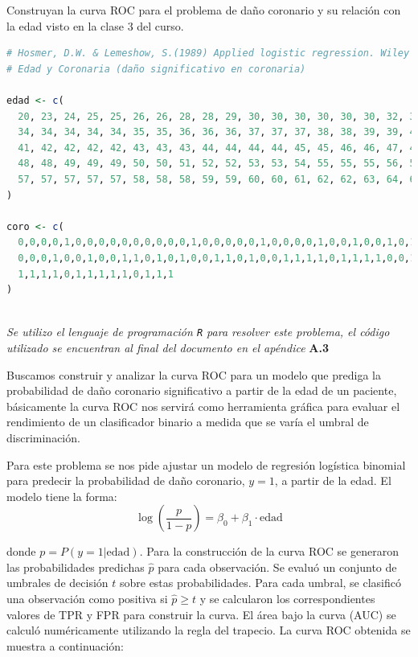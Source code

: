 Construyan la curva ROC para el problema de daño coronario y su relación con la edad visto en la clase 3 del curso.

\begin{lstlisting}[language=R, caption={Datos de Edad y Daño Coronario}]
# Hosmer, D.W. & Lemeshow, S.(1989) Applied logistic regression. Wiley
# Edad y Coronaria (daño significativo en coronaria)

edad <- c(
  20, 23, 24, 25, 25, 26, 26, 28, 28, 29, 30, 30, 30, 30, 30, 30, 32, 32, 33, 33,
  34, 34, 34, 34, 34, 35, 35, 36, 36, 36, 37, 37, 37, 38, 38, 39, 39, 40, 40, 41,
  41, 42, 42, 42, 42, 43, 43, 43, 44, 44, 44, 44, 45, 45, 46, 46, 47, 47, 47, 48,
  48, 48, 49, 49, 49, 50, 50, 51, 52, 52, 53, 53, 54, 55, 55, 55, 56, 56, 56, 57,
  57, 57, 57, 57, 57, 58, 58, 58, 59, 59, 60, 60, 61, 62, 62, 63, 64, 64, 65, 69
)

coro <- c(
  0,0,0,0,1,0,0,0,0,0,0,0,0,0,0,1,0,0,0,0,0,1,0,0,0,0,1,0,0,1,0,0,1,0,1,0,1,0,1,0,
  0,0,0,1,0,0,1,0,0,1,1,0,1,0,1,0,0,1,1,0,1,0,0,1,1,1,1,0,1,1,1,1,0,0,1,1,1,1,0,
  1,1,1,1,0,1,1,1,1,1,0,1,1,1
)
\end{lstlisting}

\newpage
\noindent{}\\

\textit{Se utilizo el lenguaje de programación \texttt{R} para resolver este problema, el código utilizado se encuentran al final del documento en el apéndice} \textbf{A.3}

Buscamos construir y analizar la curva ROC para un modelo que prediga la probabilidad de daño coronario significativo a partir de la edad de un paciente, básicamente la curva ROC nos servirá como herramienta gráfica para evaluar el rendimiento de un clasificador binario a medida que se varía el umbral de discriminación. 

Para este problema se nos pide ajustar un modelo de regresión logística binomial para predecir la probabilidad de daño coronario, $y=1$, a partir de la edad. El modelo tiene la forma:
\begin{equation}
    \log\left(\frac{p}{1-p}\right) = \beta_0 + \beta_1 \cdot \text{edad}
\end{equation}

donde $p = P(y=1 | \text{edad})$. Para la construcción de la curva ROC se generaron las probabilidades predichas $\hat{p}$ para cada observación. Se evaluó un conjunto de umbrales de decisión $t$ sobre estas probabilidades. Para cada umbral, se clasificó una observación como positiva si $\hat{p} \ge t$ y se calcularon los correspondientes valores de TPR y FPR para construir la curva. El área bajo la curva (AUC) se calculó numéricamente utilizando la regla del trapecio. La curva ROC obtenida se muestra a continuación:

